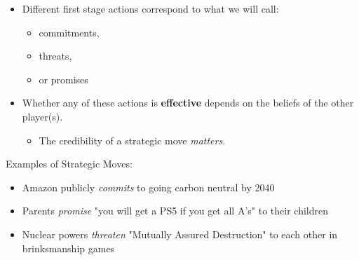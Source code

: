 \documentclass{beamer}
\theoremstyle{plain}
\begin{document}

\begin{frame}{}
  \begin{itemize}
    \item Different first stage actions correspond to what we will call:
    \begin{itemize}
      \item \alert{commitments},
      \item \alert{threats},
      \item or \alert{promises}
    \end{itemize}
    \item Whether any of these actions is \textbf{effective}
    depends on the beliefs of the other player(s).
    \begin{itemize}
      \item The \alert{credibility} of a strategic move \textit{matters}.
    \end{itemize}
  \end{itemize} 
\end{frame}


\begin{frame}{}
  Examples of Strategic Moves:
  \begin{itemize}
    \item Amazon publicly \textit{commits} to going carbon neutral by 2040
    \item Parents \textit{promise} "you will get a PS5 if you get all A's" 
    to their children
    \item Nuclear powers \textit{threaten} "Mutually Assured Destruction"
    to each other in \alert{brinksmanship} games
  \end{itemize}
\end{frame}

\end{document}

